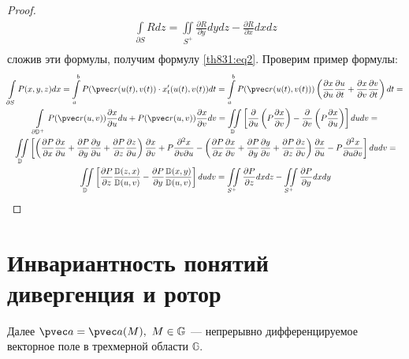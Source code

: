 \begin{proof}
\begin{gather*}
    \int\limits_{\partial S} Rdz = \iint\limits_{S^+} \frac{\partial
    R}{\partial y} dy dz - \frac{\partial R}{\partial x} dx dz \\
  \end{gather*}
  сложив эти формулы, получим формулу \eqref{th831:eq2}. Проверим пример
  формулы:
  \begin{gather*}
    \int\limits_{\partial S} P(x, y, z) dx = \int\limits_a^b P(\pvec r(u(t),
    v(t)) \cdot x_t' (u(t), v(t)) dt = \int\limits_a^b P(\pvec r(u(t), v(t)))
    \left(\frac{\partial x}{\partial u} \frac{\partial u}{\partial t} +
    \frac{\partial x}{\partial v} \frac{\partial v}{\partial t}\right) dt = \\
    \int\limits_{\partial \mathbb{D}^+} P(\pvec r(u, v)) \frac{\partial
    x}{\partial u} du + P(\pvec r(u, v)) \frac{\partial x}{\partial v} dv =
    \iint\limits_{\mathbb{D}} \left[ \frac{\partial }{\partial u}\left(P
      \frac{\partial x}{\partial v} \right) - \frac{\partial }{\partial
      v}\left(P \frac{\partial x}{\partial u} \right) \right] du dv =\\
      \iint\limits_{\mathbb{D}} \left[\left(\frac{\partial P}{\partial x}
        \frac{\partial x}{\partial u} + \frac{\partial P}{\partial y}
        \frac{\partial y}{\partial u} + \frac{\partial P}{\partial z}
        \frac{\partial z}{\partial u}\right) \frac{\partial x}{\partial v} +
        P \frac{\partial^2 x}{\partial v \partial u} - \left(\frac{\partial
        P}{\partial x} \frac{\partial x}{\partial v} + \frac{\partial
        P}{\partial y} \frac{\partial y}{\partial v} + \frac{\partial
        P}{\partial z} \frac{\partial z}{\partial v} \right) \frac{\partial
        x}{\partial u} - P\frac{\partial^2 x}{\partial u \partial v}\right] du
        dv = \\
        \iint\limits_{\mathbb{D}} \left[\frac{\partial P}{\partial z}
        \frac{\mathbb{D}(z, x)}{\mathbb{D}(u, v)} - \frac{\partial
        P}{\partial y}\frac{\mathbb{D}(x, y)}{\mathbb{D}(u, v)}\right] du dv =
        \iint\limits_{S^+} \frac{\partial P}{\partial z} dx dz -
        \iint\limits_{S^+} \frac{\partial P}{\partial y} dx dy
  \end{gather*}
\end{proof}

\section{Инвариантность понятий дивергенция и ротор}
Далее $\pvec a = \pvec a(M), \ M \in \mathbb{G}$ --- непрерывно
дифференцируемое векторное поле в трехмерной области $\mathbb{G}$.

